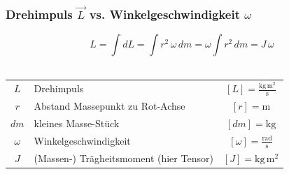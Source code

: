 		\subsubsection{Drehimpuls $\vec{L}$ vs. Winkelgeschwindigkeit $\omega$}

		$$ \boxed{ L = \int dL = \int r^2 \, \omega \, dm = \omega \int r^2 \, dm = J \, \omega }$$ \\
		
			\begin{tabular}{c l c}
				$L$ & Drehimpuls & $[L] = \mathrm{\frac{kg \, m^2}{s}}$ \\
				$r$ & Abstand Massepunkt zu Rot-Achse & $[r] = \mathrm{m}$ \\
				$dm$ & kleines Masse-Stück & $[dm] = \mathrm{kg}$ \\
				$\omega$ & Winkelgeschwindigkeit & $[\omega] = \mathrm{\frac{rad}{s}}$ \\
				$J$ & (Massen-) Trägheitsmoment (hier Tensor) & $[J] = \mathrm{kg \, m^2}$ \\
			\end{tabular}

